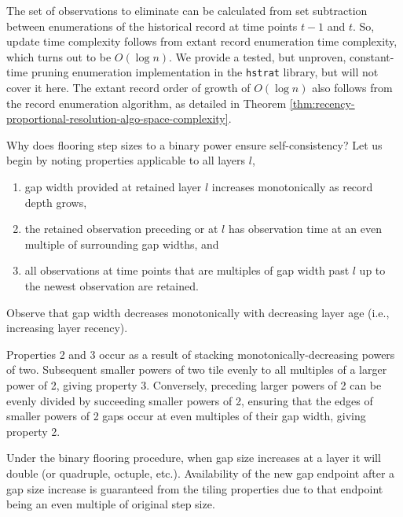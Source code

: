 The set of observations to eliminate can be calculated from set subtraction between enumerations of the historical record at time points $t-1$ and $t$.
So, update time complexity follows from extant record enumeration time complexity, which turns out to be $O(\log n)$.
We provide a tested, but unproven, constant-time pruning enumeration implementation in the \texttt{hstrat} library, but will not cover it here. %
The extant record order of growth of $O(\log n)$ also follows from the record enumeration algorithm, as detailed in Theorem \ref{thm:recency-proportional-resolution-algo-space-complexity}.


Why does flooring step sizes to a binary power ensure self-consistency?
Let us begin by noting properties applicable to all layers $l$,
\begin{enumerate}
\item gap width provided at retained layer $l$ increases monotonically as record depth grows,
\item the retained observation preceding or at $l$ has observation time at an even multiple of surrounding gap widths, and
\item all observations at time points that are multiples of gap width past $l$ up to the newest observation are retained.
\end{enumerate}
Observe that gap width decreases monotonically with decreasing layer age (i.e., increasing layer recency).

Properties 2 and 3 occur as a result of stacking monotonically-decreasing powers of two.
Subsequent smaller powers of two tile evenly to all multiples of a larger power of 2, giving property 3.
Conversely, preceding larger powers of 2 can be evenly divided by succeeding smaller powers of 2, ensuring that the edges of smaller powers of 2 gaps occur at even multiples of their gap width, giving property 2.

Under the binary flooring procedure, when gap size increases at a layer it will double (or quadruple, octuple, etc.).
Availability of the new gap endpoint after a gap size increase is guaranteed from the tiling properties due to that endpoint being an even multiple of original step size.

